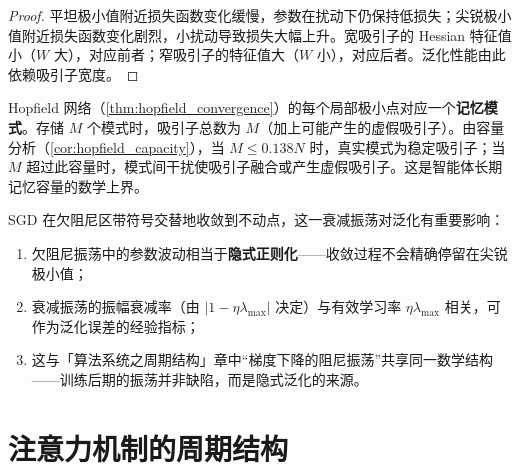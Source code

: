 \begin{proof}
平坦极小值附近损失函数变化缓慢，参数在扰动下仍保持低损失；尖锐极小值附近损失函数变化剧烈，小扰动导致损失大幅上升。宽吸引子的 Hessian 特征值小（$W$ 大），对应前者；窄吸引子的特征值大（$W$ 小），对应后者。泛化性能由此依赖吸引子宽度。
\end{proof}

\begin{example}[模式记忆与容量分析]\label{ex:pattern_memory}
Hopfield 网络（\cref{thm:hopfield_convergence}）的每个局部极小点对应一个\textbf{记忆模式}。存储 $M$ 个模式时，吸引子总数为 $M$（加上可能产生的虚假吸引子）。由容量分析（\cref{cor:hopfield_capacity}），当 $M\le0.138N$ 时，真实模式为稳定吸引子；当 $M$ 超过此容量时，模式间干扰使吸引子融合或产生虚假吸引子。这是智能体长期记忆容量的数学上界。
\end{example}

\begin{remark}\label{rem:sgd_limit_cycle_generalisation}
SGD 在欠阻尼区带符号交替地收敛到不动点，这一衰减振荡对泛化有重要影响：
\begin{enumerate}[label=(\roman*)]
    \item 欠阻尼振荡中的参数波动相当于\textbf{隐式正则化}——收敛过程不会精确停留在尖锐极小值；
    \item 衰减振荡的振幅衰减率（由 $|1-\eta\lambda_{\max}|$ 决定）与有效学习率 $\eta\lambda_{\max}$ 相关，可作为泛化误差的经验指标；
    \item 这与「算法系统之周期结构」章中“梯度下降的阻尼振荡”共享同一数学结构——训练后期的振荡并非缺陷，而是隐式泛化的来源。
\end{enumerate}
\end{remark}

\section{注意力机制的周期结构}

